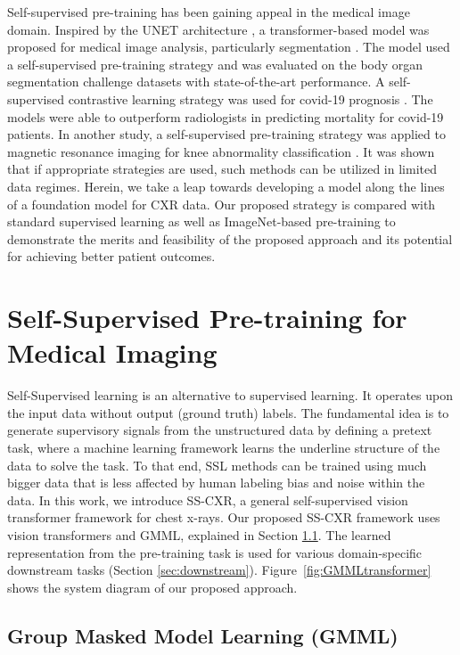 \documentclass[10pt,journal,compsoc]{IEEEtran}
\begin{document}
Self-supervised pre-training has been gaining appeal in the medical image domain. Inspired by the UNET architecture \cite{unet}, a transformer-based model was proposed for medical image analysis, particularly segmentation \cite{unetr}. The model used a self-supervised pre-training strategy and was evaluated on the body organ segmentation challenge datasets with state-of-the-art performance. A self-supervised contrastive learning strategy was used for covid-19 prognosis \cite{sriram2021covid}. The models were able to outperform radiologists in predicting mortality for covid-19 patients. In another study, a self-supervised pre-training strategy was applied to magnetic resonance imaging for knee abnormality classification \cite{atito2022sb}. It was shown that if appropriate strategies are used, such methods can be utilized in limited data regimes. Herein, we take a leap towards developing a model along the lines of a foundation model for CXR data. Our proposed strategy is compared with standard supervised learning as well as ImageNet-based pre-training to demonstrate the merits and feasibility of the proposed approach and its potential for achieving better patient outcomes.       





\section{Self-Supervised Pre-training for Medical Imaging}


Self-Supervised learning is an alternative to supervised learning. It operates upon the input data without output (ground truth) labels. The fundamental idea is to generate supervisory signals from the unstructured data by defining a pretext task, where a machine learning framework learns the underline structure of the data to solve the task. To that end, SSL methods can be trained using much bigger data that is less affected by human labeling bias and noise within the data. 
In this work, we introduce SS-CXR, a general self-supervised vision transformer framework for chest x-rays. Our proposed SS-CXR framework uses vision transformers \cite{pmlr-v139-touvron21a} and GMML, explained in Section \ref{sec:GMML}. The learned representation from the pre-training task is used for various domain-specific downstream tasks (Section \ref{sec:downstream}).  Figure~\ref{fig:GMMLtransformer} shows the system diagram of our proposed approach. 

\subsection{Group Masked Model Learning (GMML)}
\label{sec:GMML}
\end{document}
